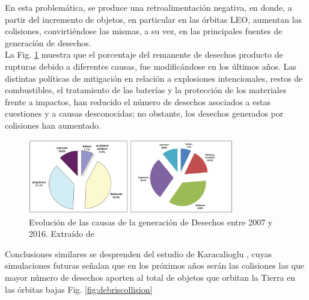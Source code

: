 En esta problem\'atica, se produce una retroalimentaci\'on negativa, en donde, a partir del incremento de objetos, en particular en las \'orbitas LEO, aumentan las colisiones, convirti\'endose las mismas, a su vez, en las principales fuentes de generaci\'on de desechos.\\ 

La Fig. \ref{fig:causadesechos} muestra que el porcentaje del remanente de desechos producto de rupturas debido a diferentes causas, fue modific\'andose en los \'ultimos a\~nos. Las distintas pol\'iticas de mitigaci\'on en relaci\'on a explosiones intencionales, restos de combustibles, el tratamiento de las bater\'ias y la protecci\'on de los materiales frente a impactos, han reducido el n\'umero de desechos asociados a estas cuestiones y a causas desconocidas; no obstante, los desechos generados por colisiones han aumentado.\\

\begin{figure}[!h]
  \centering
  \includegraphics[width=0.8\textwidth]{imagenes/breakupsQNews}
  \caption[Evoluci\'on de las causas de la generaci\'on de Desechos]{Evoluci\'on de las causas de la generaci\'on de Desechos entre 2007 y 2016. Extra\'ido de \citep{ODQNum}}
  \label{fig:causadesechos}
\end{figure}

Conclusiones similares se desprenden del estudio de Karacalioglu \citep{karacalioglu2016impact}, cuyas simulaciones futuras se\~nalan que en los pr\'oximos a\~nos ser\'an las colisiones las que mayor n\'umero de desechos aporten al total de objetos que orbitan la Tierra en las \'orbitas bajas Fig. \ref{fig:debriscollision}\\

